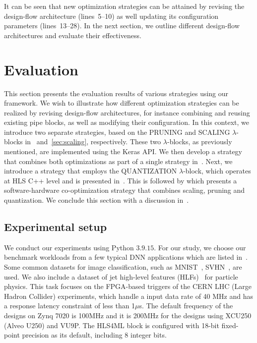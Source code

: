 It can be seen that new optimization strategies can be attained by revising the design-flow architecture (lines~5--10) as well updating its configuration parameters (lines~13--28). In the next section, we outline different design-flow architectures and evaluate their effectiveness.


\section{Evaluation}\label{sec:evaluation}

This section presents the evaluation results of various strategies using our framework. We wish to illustrate how different optimization strategies can be realized by revising design-flow architectures, for instance combining and reusing existing pipe blocks, as well as modifying their configuration. In this context, we introduce two separate strategies, based on the PRUNING and SCALING $\lambda$-blocks in~ and~\ref{sec:scaling}, respectively. These two $\lambda$-blocks, as previously mentioned, are implemented using the Keras API. We then develop a strategy that combines both optimizations as part of a single strategy in~. Next, we introduce a strategy that employs the QUANTIZATION $\lambda$-block, which operates at HLS C++ level and is presented in~. This is followed by  which presents a software-hardware co-optimization strategy that combines scaling, pruning and quantization. We conclude this section with a discussion in~. 

\subsection{Experimental setup}

We conduct our experiments using Python $3.9.15$. For our study, we choose our benchmark workloads from a few typical DNN applications which are listed in~. 
Some common datasets for image classification, such as MNIST~\cite{lecun1998gradient}, SVHN~\cite{netzer2011reading}, are used. We also include a dataset of jet high-level features (HLFs)~\cite{duarte2018fast, moreno2020jedi} for particle physics. This task focuses on the FPGA-based triggers of the CERN LHC (Large Hadron Collider) experiments, which handle a input data rate of 40 MHz and has a response latency constraint of less than 1$\mu$s. 
The default frequency of the designs on Zynq 7020 is 100MHz and it is 200MHz for the designs using XCU250 (Alveo U250) and VU9P. The HLS4ML block is configured with 18-bit fixed-point precision as its default, including 8 integer bits. 

